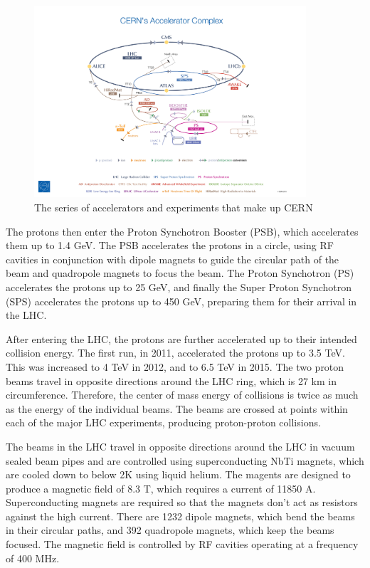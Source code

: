 \documentclass[oneside, letterpaper, oldfontcommands]{memoir}
\begin{document}
\begin{figure}[here]
\includegraphics[width=0.9\textwidth]{CERN's-accelerator-complex2013.jpg}
\caption{The series of accelerators and experiments that make up CERN \cite{Marcastel:1621583}}
\label{fig:cernacc}
\end{figure}

\qquad The protons then enter the Proton Synchotron Booster (PSB), which accelerates them up to 1.4 GeV. The PSB accelerates the protons in a circle, using RF cavities in conjunction with dipole magnets to guide the circular path of the beam and quadropole magnets to focus the beam. The Proton Synchotron (PS) accelerates the protons up to 25 GeV, and finally the Super Proton Synchotron (SPS) accelerates the protons up to 450 GeV, preparing them for their arrival in the LHC.

\qquad After entering the LHC, the protons are further accelerated up to their intended collision energy. The first run, in 2011, accelerated the protons up to 3.5 TeV. This was increased to 4 TeV in 2012, and to 6.5 TeV in 2015. The two proton beams travel in opposite directions around the LHC ring, which is 27 km in circumference. Therefore, the center of mass energy of collisions is twice as much as the energy of the individual beams. The beams are crossed at points within each of the major LHC experiments, producing proton-proton collisions.

\qquad The beams in the LHC travel in opposite directions around the LHC in vacuum sealed beam pipes and are controlled using superconducting NbTi magnets, which are cooled down to below 2K using liquid helium. The magents are designed to produce a magnetic field of 8.3 T, which requires a current of 11850 A. Superconducting magnets are required so that the magnets don't act as resistors against the high current. There are 1232 dipole magnets, which bend the beams in their circular paths, and 392 quadropole magnets, which keep the beams focused. The magnetic field is controlled by RF cavities operating at a frequency of 400 MHz.
\end{document}
